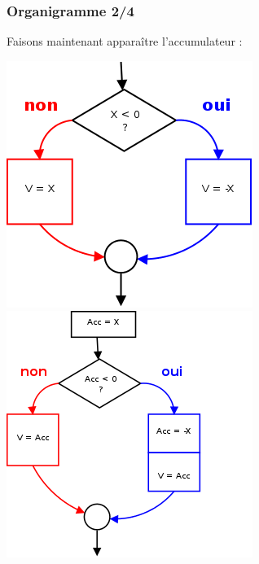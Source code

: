 \begin{frame}
  \frametitle{Organigramme 2/4}
Faisons maintenant apparaître l'accumulateur :
  \begin{multicols}{2}
\includegraphics[width=0.9\linewidth]{figures/val-abs-1}
    \break
\includegraphics[width=\linewidth]{figures/val-abs-2}    
  \end{multicols}
\end{frame}
